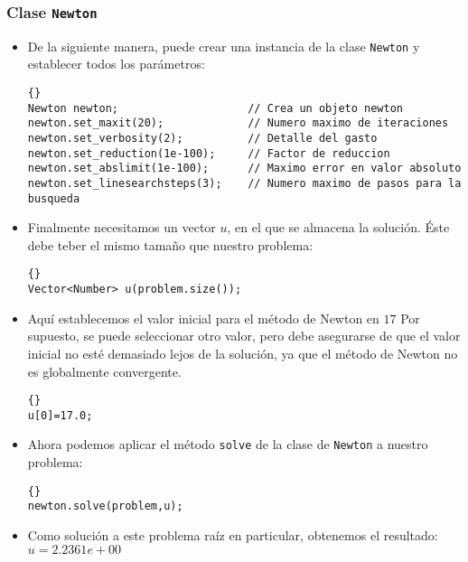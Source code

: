 \documentclass[a4paper,11pt]{article}
\theoremstyle{definition}
\begin{document}
\subsubsection{Clase \lstinline{Newton}}
\begin{itemize}
\item De la siguiente manera, puede crear una instancia de la clase \lstinline{Newton} y establecer todos los parámetros:

    {\footnotesize{\begin{lstlisting}{}
Newton newton;                    // Crea un objeto newton
newton.set_maxit(20);             // Numero maximo de iteraciones 
newton.set_verbosity(2);          // Detalle del gasto
newton.set_reduction(1e-100);     // Factor de reduccion
newton.set_abslimit(1e-100);      // Maximo error en valor absoluto
newton.set_linesearchsteps(3);    // Numero maximo de pasos para la busqueda
\end{lstlisting}}}

\item Finalmente necesitamos un vector $u$, en el que se almacena la solución. 
Éste debe teber el mismo tamaño que nuestro problema:

  {\footnotesize{\begin{lstlisting}{}
Vector<Number> u(problem.size());
\end{lstlisting}}}

\item Aquí establecemos el valor inicial para el método de Newton en $17$ Por supuesto, se puede seleccionar otro valor, pero debe asegurarse de que el valor inicial no esté demasiado lejos de la solución, ya que el método de Newton no es globalmente convergente.
  {\footnotesize{\begin{lstlisting}{}
u[0]=17.0;
\end{lstlisting}}}

\item Ahora podemos aplicar el método \lstinline{solve} de la clase de \lstinline{Newton} a nuestro problema:

  {\footnotesize{\begin{lstlisting}{}
newton.solve(problem,u);
\end{lstlisting}}}

\item Como solución a este problema raíz en particular, obtenemos el resultado:\\
  $u= 2.2361e+00$
\end{itemize}
\end{document}
